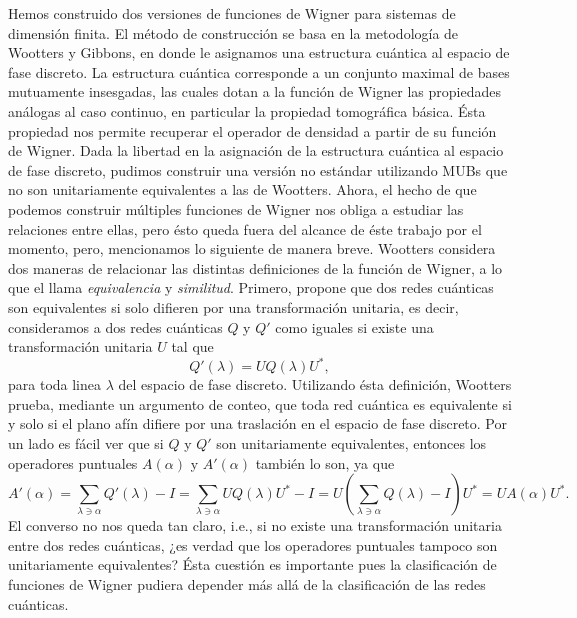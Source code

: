 \documentclass[a4paper]{report}
\begin{document}
  Hemos construido dos versiones de funciones de Wigner para
  sistemas de dimensión finita. El método de construcción se
  basa en la metodología de Wootters y Gibbons, en donde le
  asignamos una estructura cuántica al espacio de fase
  discreto. La estructura cuántica corresponde a un conjunto
  maximal de bases mutuamente insesgadas, las cuales dotan a
  la función de Wigner las propiedades análogas al caso
  continuo, en particular la propiedad tomográfica básica.
  Ésta propiedad nos permite recuperar el operador de
  densidad a partir de su función de Wigner. Dada la
  libertad en la asignación de la estructura cuántica al
  espacio de fase discreto, pudimos construir una versión no
  estándar utilizando MUBs que no son unitariamente
  equivalentes a las de Wootters. Ahora, el hecho de que
  podemos construir múltiples funciones de Wigner nos obliga
  a estudiar las relaciones entre ellas, pero ésto queda
  fuera del alcance de éste trabajo por el momento, pero,
  mencionamos lo siguiente de manera breve.  Wootters
  considera dos maneras de relacionar las distintas
  definiciones de la función de Wigner, a lo que el llama
  \textit{equivalencia} y \textit{similitud}. Primero,
  propone que dos redes cuánticas son equivalentes si solo
  difieren por una transformación unitaria, es decir,
  consideramos a dos redes cuánticas $Q$ y $Q'$ como iguales
  si existe una transformación unitaria $U$ tal que
  \begin{equation}
    Q'(\lambda)
    = U Q(\lambda) U^{*},
  \end{equation}
  para toda linea $\lambda$ del espacio de fase discreto.
  Utilizando ésta definición, Wootters prueba, mediante un
  argumento de conteo, que toda red cuántica es equivalente
  si y solo si el plano afín difiere por una traslación en
  el espacio de fase discreto. Por un lado es fácil ver que
  si $Q$ y $Q'$ son unitariamente equivalentes, entonces los
  operadores puntuales $A(\alpha)$ y $A'(\alpha)$ también lo
  son, ya que
  \begin{equation}
    A'(\alpha)
    = \sum_{\lambda \ni \alpha}^{} Q'(\lambda) - I 
    = \sum_{\lambda \ni \alpha}^{} U Q(\lambda) U^{*} - I
    = U \left( 
      \sum_{\lambda \ni \alpha}^{} Q(\lambda) - I
    \right) U^{*} 
    = U A(\alpha) U^{*}.
  \end{equation}
  El converso no nos queda tan claro, i.e., si no existe una
  transformación unitaria entre dos redes cuánticas, ¿es
  verdad que los operadores puntuales tampoco son
  unitariamente equivalentes? Ésta cuestión es importante
  pues la clasificación de funciones de Wigner pudiera
  depender más allá de la clasificación de las redes
  cuánticas.
\end{document}
